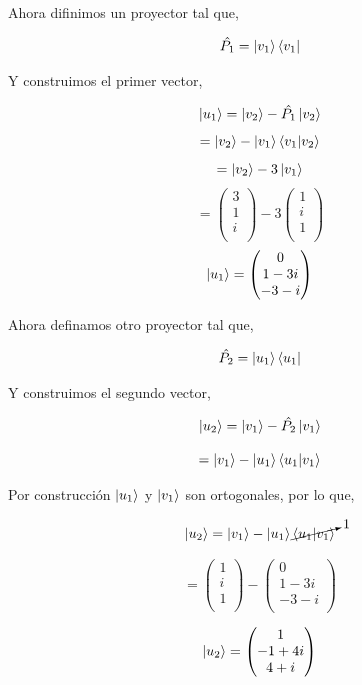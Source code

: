 \documentclass[12pt,a4paper]{article}
\begin{document}
\begin{enumerate}
\begin{enumerate}
Ahora difinimos un proyector tal que,

\[
\hat{P_{1}} = \ket{v_{1}} \bra{v_{1}}
\]

Y construimos el primer vector,

\[
\ket{u_{1}} = \ket{v_{2}} -\hat{P_{1}} \ket{v_{2}}
\]
\[
= \ket{v_{2}} - \ket{v_{1}}\braket{v_{1}|v_{2}}
\]
\[
= \ket{v_{2}} - 3\ket{v_{1}}
\]
\[
= \begin{pmatrix}
3 \\
1 \\
i \\  
\end{pmatrix} - 3\begin{pmatrix}
1 \\
i \\
1 \\  
\end{pmatrix}
\]
\[
\ket{u_{1}} = \begin{pmatrix}
0 \\
1-3i\\ 
-3-i \\  
\end{pmatrix} 
\]

Ahora definamos otro proyector tal que,

\[
\hat{P_{2}} = \ket{{u_{1}}} \bra{u_{1}}
\]

Y construimos el segundo vector,

\[
\ket{u_{2}} = \ket{v_{1}} - \hat{P_{2}} \ket{v_{1}}
\]

\[
= \ket{v_{1}} - \ket{{u_{1}}} \braket{u_{1}|v_{1}}
\]

Por construcción $ \ket{u_{1}} $ y $ \ket{v_{1}} $ son ortogonales, por lo que,

\[
\ket{u_{2}} = \ket{v_{1}} - \ket{{u_{1}}} \cancelto{1}{\braket{u_{1}|v_{1}}}
\]

\[
= \begin{pmatrix}
1 \\
i \\
1 \\  
\end{pmatrix} - \begin{pmatrix}
0 \\
1-3i \\
-3-i \\  
\end{pmatrix}
\]

\[
\ket{u_{2}} = \begin{pmatrix}
1 \\
-1+4i \\
4+i \\  
\end{pmatrix}
\]


\end{enumerate}
\end{enumerate}
\end{document}
